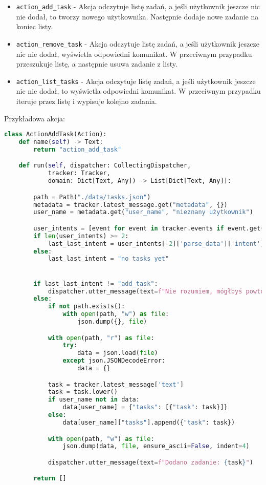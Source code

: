 \documentclass{article}
\begin{document}
\begin{itemize}
    \item[\textcolor{violet}{\textbullet}] \verb|action_add_task| - Akcja odczytuje listę zadań, a jeśli
        użytkownik jeszcze nic nie dodał, to tworzy nowego użytkownika.
        Następnie dodaje nowe zadanie na koniec listy.
    \item[\textcolor{violet}{\textbullet}] \verb|action_remove_task| - Akcja odczytuje listę zadań, a jeśli
        użytkownik jeszcze nic nie dodał, wyświetla odpowiedni komunikat.
        W przeciwnym przypadku przeszukuje listę, a następnie usuwa zadanie
        z listy.
    \item[\textcolor{violet}{\textbullet}] \verb|action_list_tasks| - Akcja odczytuje listę zadań, a jeśli
        użytkownik jeszcze nic nie dodał, to wyświetla odpowiedni komunikat.
        W przeciwnym przypadku iteruje przez listę i wypisuje kolejno zadania.
\end{itemize}
Przykładowa akcja:
\begin{lstlisting}[language=Python, caption=Akcja dodawania]
class ActionAddTask(Action):
    def name(self) -> Text:
        return "action_add_task"

    def run(self, dispatcher: CollectingDispatcher,
            tracker: Tracker,
            domain: Dict[Text, Any]) -> List[Dict[Text, Any]]:

        path = Path("./data/tasks.json")
        metadata = tracker.latest_message.get("metadata", {})
        user_name = metadata.get("user_name", "nieznany użytkownik")

        user_intents = [event for event in tracker.events if event.get("event") == "user"]
        if len(user_intents) >= 2:
            last_last_intent = user_intents[-2]['parse_data']['intent']['name']
        else:
            last_last_intent = "no tasks yet"


        if last_last_intent != "add_task":
            dispatcher.utter_message(text=f"Nie rozumiem, mógłbyś powtórzyć?")
        else:
            if not path.exists():
                with open(path, "w") as file:
                    json.dump({}, file)

            with open(path, "r") as file:
                try:
                    data = json.load(file)
                except json.JSONDecodeError:
                    data = {}

            task = tracker.latest_message['text']
            task = task.lower()
            if user_name not in data:
                data[user_name] = {"tasks": [{"task": task}]}
            else:
                data[user_name]["tasks"].append({"task": task})

            with open(path, "w") as file:
                json.dump(data, file, ensure_ascii=False, indent=4)

            dispatcher.utter_message(text=f"Dodano zadanie: {task}")

        return []
\end{lstlisting}
\end{document}
